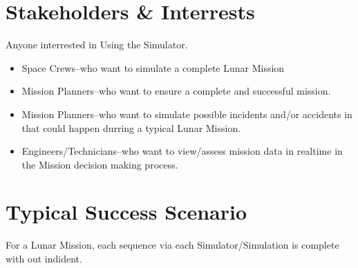 \documentclass[letterpaper]{article}
\begin{document}
\section{Stakeholders \& Interrests}
Anyone interrested in Using the Simulator.
\begin{itemize}
\item Space Crews--who want to simulate a complete Lunar Mission
\item Mission Planners--who want to ensure a complete and successful
mission.
\item Mission Planners--who want to simulate possible incidents
and/or accidents in that could happen durring a typical Lunar
Mission.
\item Engineers/Technicians--who want to view/assess mission data in
realtime in the Mission decision making process.
\end{itemize}

\section{Typical Success Scenario}
For a Lunar Mission, each sequence via each Simulator/Simulation is
complete with out indident.
\end{document}
